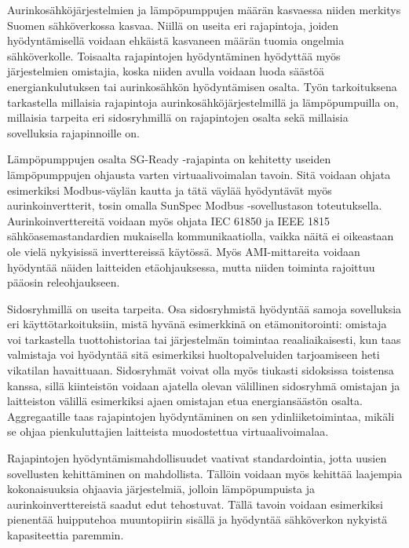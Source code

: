 Aurinkosähköjärjestelmien ja lämpöpumppujen määrän kasvaessa niiden merkitys Suomen sähköverkossa kasvaa. Niillä on useita eri rajapintoja, joiden hyödyntämisellä voidaan ehkäistä kasvaneen määrän tuomia ongelmia sähköverkolle. Toisaalta rajapintojen hyödyntäminen hyödyttää myös järjestelmien omistajia, koska niiden avulla voidaan luoda säästöä energiankulutuksen tai aurinkosähkön hyödyntämisen osalta. Työn tarkoituksena tarkastella millaisia rajapintoja aurinkosähköjärjestelmillä ja lämpöpumpuilla on, millaisia tarpeita eri sidosryhmillä on rajapintojen osalta sekä millaisia sovelluksia rajapinnoille on.

Lämpöpumppujen osalta SG-Ready -rajapinta on kehitetty useiden lämpöpumppujen ohjausta varten virtuaalivoimalan tavoin. Sitä voidaan ohjata esimerkiksi Modbus-väylän kautta ja tätä väylää hyödyntävät myös aurinkoinvertterit, tosin omalla SunSpec Modbus -sovellustason toteutuksella. Aurinkoinverttereitä voidaan myös ohjata IEC 61850 ja IEEE 1815 sähköasemastandardien mukaisella kommunikaatiolla, vaikka näitä ei oikeastaan ole vielä nykyisissä inverttereissä käytössä. Myös AMI-mittareita voidaan hyödyntää näiden laitteiden etäohjauksessa, mutta niiden toiminta rajoittuu pääosin releohjaukseen. 

Sidosryhmillä on useita tarpeita. Osa sidosryhmistä hyödyntää samoja sovelluksia eri käyttötarkoituksiin, mistä hyvänä esimerkkinä on etämonitorointi: omistaja voi tarkastella tuottohistoriaa tai järjestelmän toimintaa reaaliaikaisesti, kun taas valmistaja voi hyödyntää sitä esimerkiksi huoltopalveluiden tarjoamiseen heti vikatilan havaittuaan. Sidosryhmät voivat olla myös tiukasti sidoksissa toistensa kanssa, sillä kiinteistön voidaan ajatella olevan välillinen sidosryhmä omistajan ja laitteiston välillä esimerkiksi ajaen omistajan etua energiansäästön osalta. Aggregaatille taas rajapintojen hyödyntäminen on sen ydinliiketoimintaa, mikäli se ohjaa pienkuluttajien laitteista muodostettua virtuaalivoimalaa.

Rajapintojen hyödyntämismahdollisuudet vaativat standardointia, jotta uusien sovellusten kehittäminen on mahdollista. Tällöin voidaan myös kehittää laajempia kokonaisuuksia ohjaavia järjestelmiä, jolloin lämpöpumpuista ja aurinkoinverttereistä saadut edut tehostuvat. Tällä tavoin voidaan esimerkiksi pienentää huipputehoa muuntopiirin sisällä ja hyödyntää sähköverkon nykyistä kapasiteettia paremmin.